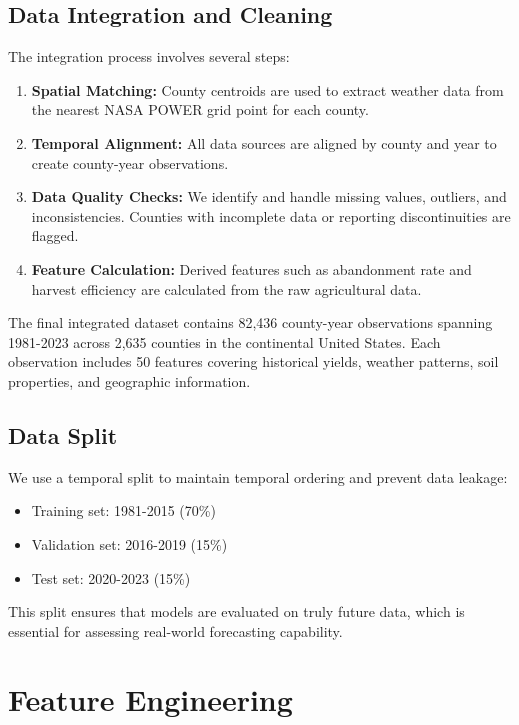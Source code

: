 \documentclass[conference]{IEEEtran}
\begin{document}
\subsection{Data Integration and Cleaning}

The integration process involves several steps:

\begin{enumerate}
    \item \textbf{Spatial Matching:} County centroids are used to extract weather data from the nearest NASA POWER grid point for each county.
    \item \textbf{Temporal Alignment:} All data sources are aligned by county and year to create county-year observations.
    \item \textbf{Data Quality Checks:} We identify and handle missing values, outliers, and inconsistencies. Counties with incomplete data or reporting discontinuities are flagged.
    \item \textbf{Feature Calculation:} Derived features such as abandonment rate and harvest efficiency are calculated from the raw agricultural data.
\end{enumerate}

The final integrated dataset contains 82,436 county-year observations spanning 1981-2023 across 2,635 counties in the continental United States. Each observation includes 50 features covering historical yields, weather patterns, soil properties, and geographic information.

\subsection{Data Split}

We use a temporal split to maintain temporal ordering and prevent data leakage:
\begin{itemize}
    \item Training set: 1981-2015 (70\%)
    \item Validation set: 2016-2019 (15\%)
    \item Test set: 2020-2023 (15\%)
\end{itemize}

This split ensures that models are evaluated on truly future data, which is essential for assessing real-world forecasting capability.

\section{Feature Engineering}
\end{document}
